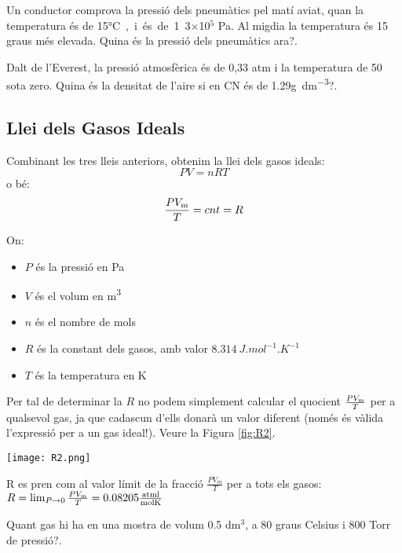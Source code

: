 \begin{exr}
    Un conductor comprova la pressió dels pneumàtics pel matí aviat, quan la temperatura és de 15\si\degreeCelsius, i és de 1.3$\times$10$^5$ Pa. Al migdia la temperatura és 15 graus més elevada. Quina és la pressió dels pneumàtics ara?.
    \end{exr}

      
    \begin{exr}
        Dalt de l'Everest, la pressió atmosfèrica és de 0,33 atm i la temperatura de 50 sota zero. Quina és la densitat de l'aire si en CN és de 1.29\si{\gram\per\deci\meter\tothe{3}}?.
        \end{exr}
    

\subsection{Llei dels Gasos Ideals}
Combinant les tres lleis anteriors, obtenim la llei dels gasos ideals:
\begin{equation}
    P V = n R T
\end{equation}
o bé:
\[\frac{P V_{\rm m}}{T}= cnt = R\]

On:
\begin{itemize}
    \item \( P \) és la pressió en \si{Pa}
    \item \( V \) és el volum en \si{m^3}
    \item \( n \) és el nombre de mols
    \item \( R \) és la constant dels gasos, amb valor \( \SI{8.314}{J.mol^{-1}.K^{-1}} \)
    \item \( T \) és la temperatura en \si{K}
\end{itemize}

Per tal de determinar la $R$ no podem simplement calcular el quocient $\frac{P V_{\rm m}}{T}$ per a qualsevol gas, ja que cadascun d'ells donarà un valor diferent (només és vàlida l'expressió per a un gas ideal!). Veure la Figura \ref{fig:R2}.
\begin{marginfigure}
\centering
\texttt{[image: R2.png]}
\caption[Determinació de la constant dels gasos $R$]{R es pren com al valor límit de la fracció $\frac{P V_m}{T}$ per a tots els gasos: 
$R=\lim_{P \to 0} \frac{P V_{\rm m}}{T}= 0.08205 \frac{{\rm atm l}}{{\rm mol K}}$
}
\label{fig:R2}
\end{marginfigure}

\begin{exr}
    Quant gas hi ha en una mostra de volum 0.5 dm$^3$, a 80 graus Celsius i 800 Torr de pressió?.
    \end{exr}

